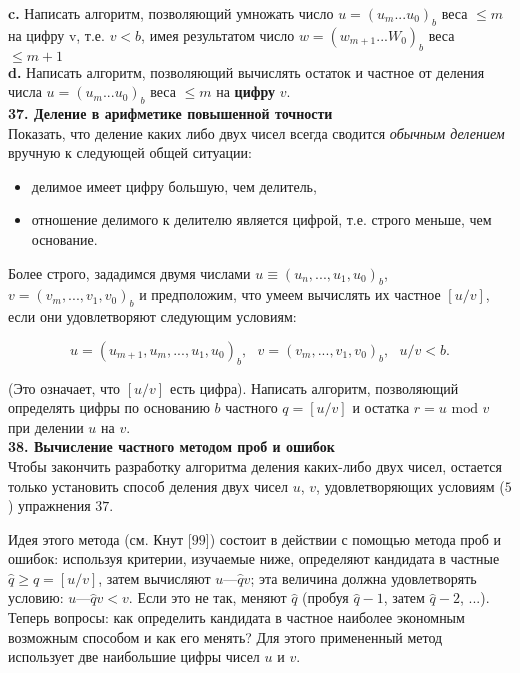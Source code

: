 \documentclass{mai_book}
\begin{document}
\textbf{c.} Написать алгоритм, позволяющий умножать число $u = (u_{m} ... u_{0})_{b}$ веса $\leqslant m$ на цифру v, т.е. $v < b$, имея результатом число $w = (w_{m+1} ... W_{0})_{b}$ веса $\leqslant m+1$\\

\textbf{d.} Написать алгоритм, позволяющий вычислять остаток и частное от деления числа $u = (u_{m} ... u_{0})_{b}$ веса $\leqslant m$ на \textbf{цифру} $v$.
\\

\noindent\textbf{37. Деление в арифметике повышенной точности}\\

Показать, что деление каких либо двух чисел всегда сводится \textit{обычным делением} вручную к следующей общей ситуации:

\begin{itemize}
\item делимое имеет цифру большую, чем делитель,
\item отношение делимого к делителю является цифрой, т.е. строго меньше, чем основание.
\end{itemize}

Более строго, зададимся двумя числами $u \equiv (u_n,...,u_1,u_0)_b$, $v = (v_m,..., v_1,v_0)_b$ и предположим, что умеем вычислять их частное $[u/v]$, если они удовлетворяют следующим условиям:

$$
u = (u_{m+1}, u_m,...,u_1,u_0)_b, \text{ } v = (v_m,..., v_1,v_0)_b, \text{ } u/v<b.
$$

(Это означает, что $[u/v]$ есть цифра). Написать алгоритм, позволяющий определять цифры по основанию $b$ частного $q = [u/v]$ и остатка $r = u \text{ mod } v$ при делении $u$ на $v$.
\\

\noindent\textbf{38. Вычисление частного методом проб и ошибок}\\

Чтобы закончить разработку алгоритма деления каких-либо двух чисел, остается только установить способ деления двух чисел $u$, $v$, удовлетворяющих условиям ($5$) упражнения $37$.

Идея этого метода (см. Кнут [$99$]) состоит в действии с помощью метода проб и ошибок: используя критерии, изучаемые ниже, определяют кандидата в частные $\widehat{q} \geqslant q = [u/v]$, затем вычисляют $u — \widehat{q}v$; эта величина должна удовлетворять условию: $u — \widehat{q}v < v$. Если это не так, меняют $\widehat{q}$ (пробуя $\widehat{q}-1$, затем $\widehat{q}-2$, ...). Теперь вопросы: как определить кандидата в частное наиболее экономным возможным способом и как его менять? Для этого примененный метод использует две наибольшие цифры чисел $u$ и $v$.
\newpage
\end{document}
